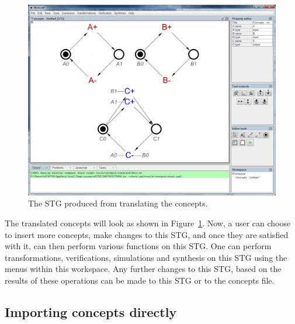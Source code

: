\documentclass[british,conference,compsoc]{IEEEtran}
\begin{document}
\begin{figure}[h]
\begin{centering}
\includegraphics[scale=0.2]{Images/concepts_translated.png}
\par\end{centering}

\begin{centering}
\protect\caption{\label{fig:concepts_translated}The STG produced from 
			translating the concepts.}

\par\end{centering}
\vspace{-4mm}
\end{figure}



The translated concepts will look as shown in 
Figure~\ref{fig:concepts_translated}. Now, a user can choose to insert more 
concepts, make changes to this STG, and once they are satisfied with it, can 
then perform various functions on this STG. One can perform transformations, 
verifications, simulations and synthesis on this STG using the menus within this 
workspace. Any further changes to this STG, based on the results of these 
operations can be made to this STG or to the concepts file. 

\vspace{-3mm}

\subsection{Importing concepts directly}
\end{document}
